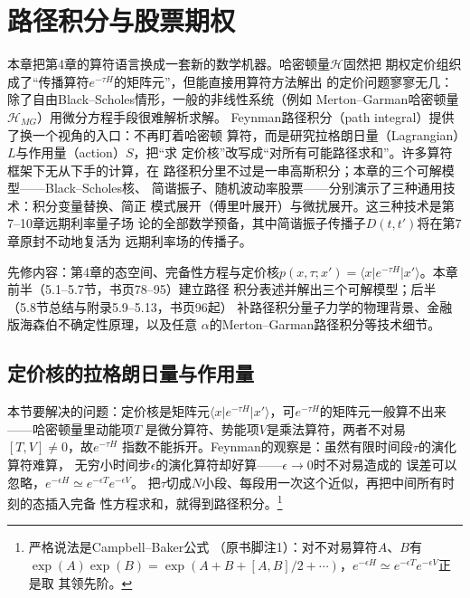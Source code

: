 \chapter{路径积分与股票期权}

本章把第4章的算符语言换成一套新的数学机器。哈密顿量$\mathcal{H}$固然把
期权定价组织成了“传播算符$e^{-\tau H}$的矩阵元”，但能直接用算符方法解出
的定价问题寥寥无几：除了自由Black--Scholes情形，一般的非线性系统（例如
Merton--Garman哈密顿量$\mathcal{H}_{MG}$）用微分方程手段很难解析求解。
Feynman路径积分（path integral）提供了换一个视角的入口：不再盯着哈密顿
算符，而是研究拉格朗日量（Lagrangian）$L$与作用量（action）$S$，把“求
定价核”改写成“对所有可能路径求和”。许多算符框架下无从下手的计算，在
路径积分里不过是一串高斯积分；本章的三个可解模型——Black--Scholes核、
简谐振子、随机波动率股票——分别演示了三种通用技术：积分变量替换、简正
模式展开（傅里叶展开）与微扰展开。这三种技术是第7--10章远期利率量子场
论的全部数学预备，其中简谐振子传播子$D(t,t')$将在第7章原封不动地复活为
远期利率场的传播子。

先修内容：第4章的态空间、完备性方程与定价核$p(x,\tau;x')=\langle x\vert
e^{-\tau H}\vert x'\rangle$。本章前半（5.1--5.7节，书页78--95）建立路径
积分表述并解出三个可解模型；后半（5.8节总结与附录5.9--5.13，书页96起）
补路径积分量子力学的物理背景、金融版海森伯不确定性原理，以及任意
$\alpha$的Merton--Garman路径积分等技术细节。

\section{定价核的拉格朗日量与作用量}

本节要解决的问题：定价核是矩阵元$\langle x\vert e^{-\tau H}\vert
x'\rangle$，可$e^{-\tau H}$的矩阵元一般算不出来——哈密顿量里动能项$T$
是微分算符、势能项$V$是乘法算符，两者不对易$[T,V]\neq0$，故$e^{-\tau H}$
指数不能拆开。Feynman的观察是：虽然有限时间段$\tau$的演化算符难算，
无穷小时间步$\epsilon$的演化算符却好算——$\epsilon\to0$时不对易造成的
误差可以忽略，$e^{-\epsilon H}\simeq e^{-\epsilon T}e^{-\epsilon V}$。
把$\tau$切成$N$小段、每段用一次这个近似，再把中间所有时刻的态插入完备
性方程求和，就得到路径积分。\footnote{严格说法是Campbell--Baker公式
（原书脚注1）：对不对易算符$A$、$B$有$\exp(A)\exp(B)=\exp(A+B+[A,B]/2
+\cdots)$，$e^{-\epsilon H}\simeq e^{-\epsilon T}e^{-\epsilon V}$正是取
其领先阶。}

